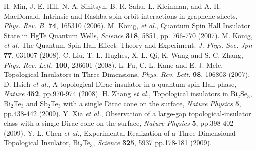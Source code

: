 \documentclass[titlepage,a4paper]{book}
\begin{document}
\begin{thebibliography}{99}
H. Min, J. E. Hill, N. A. Sinitsyn, B. R. Sahu, L. Kleinman, and A. H. MacDonald, Intrinsic and Rashba spin-orbit interactions in graphene sheets, \textit{Phys. Rev. B.} \textbf{74}, 165310 (2006).
M. König, \textit{et al.}, Quantum Spin Hall Insulator State in HgTe Quantum Wells, \textit{Science} \textbf{318}, 5851, pp. 766-770 (2007).
M. König, \textit{et al.} The Quantum Spin Hall Effect: Theory and Experiment. \textit{J. Phys. Soc. Jpn} \textbf{77}, 031007 (2008).
C. Liu, T. L. Hughes, X.-L. Qi, K. Wang and S.-C. Zhang, \textit{Phys. Rev. Lett.} \textbf{100}, 236601 (2008).
L. Fu, C. L. Kane and E. J. Mele, Topological Insulators in Three Dimensions, \textit{Phys. Rev. Lett.} \textbf{98}, 106803 (2007).
D. Hsieh \textit{et al.}, A topological Dirac insulator in a quantum spin Hall phase, \textit{Nature} \textbf{452}, pp.970-974 (2008).
H. Zhang \textit{et al.}, Topological insulators in Bi$_2$Se$_3$, Bi$_2$Te$_3$ and Sb$_2$Te$_3$ with a single Dirac cone on the surface, \textit{Nature Physics} \textbf{5}, pp.438-442 (2009).
Y. Xia \textit{et al.}, Observation of a large-gap topological-insulator class with a single Dirac cone on the surface, \textit{Nature Physics} \textbf{5}, pp.398-402 (2009).
Y. L. Chen \textit{et al.}, Experimental Realization of a Three-Dimensional Topological Insulator, Bi$_2$Te$_3$,  \textit{Science} \textbf{325}, 5937 pp.178-181 (2009).



\end{thebibliography}
\end{document}
